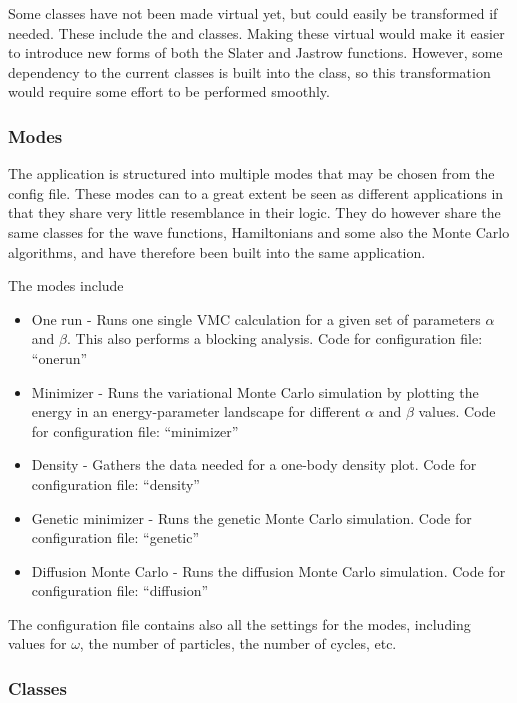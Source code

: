 \documentclass[aps,prb,twocolumn,floatfix]{revtex4}
\newcommand{\class}[1]{{\sffamily{#1}}}
\begin{document}
Some classes have not been made virtual yet, but could easily be transformed if needed. These include the \class{Jastrow} and \class{Slater} classes. Making these virtual would make it easier to introduce new forms of both the Slater and Jastrow functions. However, some dependency to the current classes is built into the \class{WaveSlater} class, so this transformation would require some effort to be performed smoothly.

\subsubsection{Modes} \label{sec:modes}

The application is structured into multiple modes that may be chosen from the config file. These modes can to a great extent be seen as different applications in that they share very little resemblance in their logic. They do however share the same classes for the wave functions, Hamiltonians and some also the Monte Carlo algorithms, and have therefore been built into the same application.

The modes include
\begin{itemize}
    \item One run - Runs one single VMC calculation for a given set of parameters $\alpha$ and $\beta$. This also performs a blocking analysis. Code for configuration file: ``onerun''
    \item Minimizer - Runs the variational Monte Carlo simulation by plotting the energy in an energy-parameter landscape for different $\alpha$ and $\beta$ values. Code for configuration file: ``minimizer''
    \item Density - Gathers the data needed for a one-body density plot. Code for configuration file: ``density''
    \item Genetic minimizer - Runs the genetic Monte Carlo simulation. Code for configuration file: ``genetic''
    \item Diffusion Monte Carlo - Runs the diffusion Monte Carlo simulation. Code for configuration file: ``diffusion''
\end{itemize}
The configuration file contains also all the settings for the modes, including values for $\omega$, the number of particles, the number of cycles, etc.

\subsubsection{Classes} \label{sec:classes}
\end{document}
